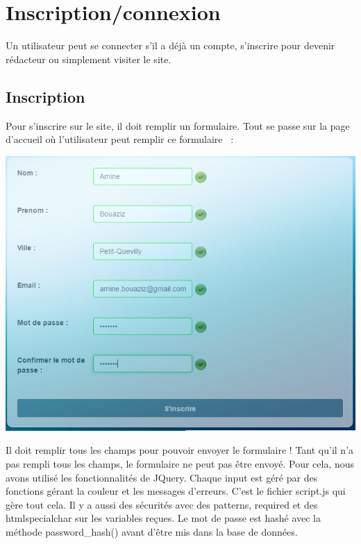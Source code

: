 \documentclass[hidelinks, 12pt,a4paper]{article}
\begin{document}
\newpage
\section{Inscription/connexion}
Un utilisateur peut se connecter s'il a déjà un compte, s'inscrire pour devenir rédacteur ou simplement visiter le site.

\subsection{Inscription}
Pour s'inscrire sur le site, il doit remplir un formulaire. Tout se passe sur la page d'accueil où l'utilisateur peut remplir ce formulaire ~:\\

\begin{center}
\includegraphics[scale=0.8]{images/inscriptionvalid.png} 
\end{center}

Il doit remplir tous les champs pour pouvoir envoyer le formulaire ! Tant qu'il n'a pas rempli tous les champs, le formulaire ne peut pas être envoyé. Pour cela, nous avons utilisé les fonctionnalités de JQuery. Chaque input est géré par des fonctions gérant la couleur et les messages d'erreurs. C’est le fichier script.js qui gère tout cela. Il y a aussi des sécurités avec des patterns, required et des htmlspecialchar sur les variables reçues.
Le mot de passe est hashé avec la méthode password\_hash() avant d'être mis dans la base de données.\\
\end{document}
